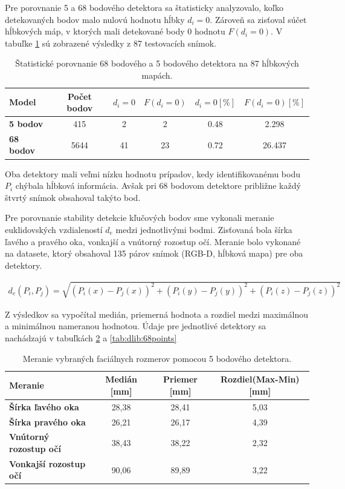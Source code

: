 Pre porovnanie 5 a 68 bodového detektora sa štatisticky analyzovalo, koľko detekovaných bodov malo nulovú hodnotu hĺbky $d_i=0$. Zároveň sa zisťoval súčet hĺbkových máp, v ktorých mali detekované body 0 hodnotu $F(d_i=0)$. V tabuľke \ref{tab:dlib:compare} sú zobrazené výsledky z 87 testovacích snímok.  

\begin{table}[h]
	\caption{\label{tab:dlib:compare} Štatistické porovnanie 68 bodového a 5 bodového detektora na 87 hĺbkových mapách.}
	\centering
	\begin{tabular}{lccccc}
		\toprule
		\textbf{Model} & \textbf{Počet bodov} & \textbf{$d_i=0$} & \textbf{$F(d_i=0)$} & \textbf{$d_i=0 [\%]$ } & \textbf{$F(d_i=0) [\%]$} \\ 
		\midrule
		\textbf{5 bodov} 	& 415 	& 2		& 2		& 0.48	& 2.298 \\
		\textbf{68 bodov} 	& 5644	& 41 	& 23	& 0.72	& 26.437 \\
		\bottomrule
	\end{tabular}
\end{table}

Oba detektory mali veľmi nízku hodnotu prípadov, kedy identifikovanému bodu $P_i$ chýbala hĺbková informácia. Avšak pri 68 bodovom detektore približne každý štvrtý snímok obsahoval takýto bod. 


Pre porovnanie stability detekcie kľučových bodov sme vykonali meranie euklidovských vzdialeností $d_e$ medzi jednotlivými bodmi. Zisťovaná bola šírka ľavého a pravého oka, vonkajší a vnútorný rozostup očí. Meranie bolo vykonané na datasete, ktorý obsahoval 135 párov snímok (RGB-D, hĺbková mapa) pre oba detektory.

\begin{equation}
\label{eq:euclidean}
\begin{aligned}
d_{e}\left(P_i,P_j\right)= \sqrt{\left(P_i(x) - P_j(x)\right)^2 + \left(P_i(y) - P_j(y)\right)^2 + \left(P_i(z) - P_j(z)\right)^2} 
\end{aligned}
\end{equation}

Z výsledkov sa vypočítal medián, priemerná hodnota a rozdiel medzi maximálnou a minimálnou nameranou hodnotou. Údaje pre jednotlivé detektory sa nachádzajú v tabuľkách \ref{tab:dlib:5points} a \ref{tab:dlib:68points}
 
\begin{table}[h]
	\caption{\label{tab:dlib:5points} Meranie vybraných faciálnych rozmerov pomocou 5 bodového detektora.}
	\centering
	\begin{tabular}{lccc}
		\toprule
		\textbf{Meranie} & \textbf{Medián [mm]} & \textbf{Priemer [mm]} & \textbf{Rozdiel(Max-Min) [mm]} \\ 
		\midrule
		\textbf{Šírka ľavého oka} 	& 28,38 & 28,41	& 5,03 \\
		\textbf{Šírka pravého oka} 	& 26,21	& 26,17 & 4,39 \\
		\textbf{Vnútorný rozostup očí} 	& 38,43	& 38,22 & 2,32 \\
		\textbf{Vonkajší rozostup očí} 	& 90,06	& 89,89 & 3,22 \\
		\bottomrule
	\end{tabular}
\end{table}

